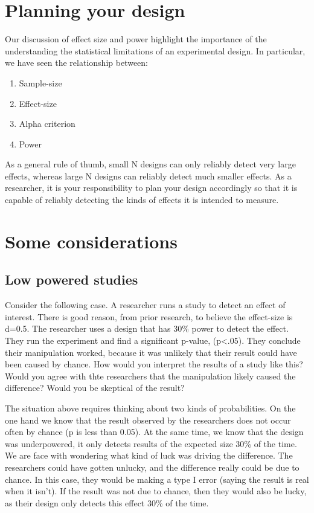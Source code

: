 \documentclass[
  letterpaper,
  DIV=11,
  numbers=noendperiod]{scrreprt}
\providecommand{\tightlist}{%
  \setlength{\itemsep}{0pt}\setlength{\parskip}{0pt}}\usepackage{longtable,booktabs,array}
\begin{document}
\section{Planning your design}\label{planning-your-design-1}

Our discussion of effect size and power highlight the importance of the
understanding the statistical limitations of an experimental design. In
particular, we have seen the relationship between:

\begin{enumerate}
\def\labelenumi{\arabic{enumi}.}
\tightlist
\item
  Sample-size
\item
  Effect-size
\item
  Alpha criterion
\item
  Power
\end{enumerate}

As a general rule of thumb, small N designs can only reliably detect
very large effects, whereas large N designs can reliably detect much
smaller effects. As a researcher, it is your responsibility to plan your
design accordingly so that it is capable of reliably detecting the kinds
of effects it is intended to measure.

\section{Some considerations}\label{some-considerations-1}

\subsection{Low powered studies}\label{low-powered-studies-1}

Consider the following case. A researcher runs a study to detect an
effect of interest. There is good reason, from prior research, to
believe the effect-size is d=0.5. The researcher uses a design that has
30\% power to detect the effect. They run the experiment and find a
significant p-value, (p\textless.05). They conclude their manipulation
worked, because it was unlikely that their result could have been caused
by chance. How would you interpret the results of a study like this?
Would you agree with thte researchers that the manipulation likely
caused the difference? Would you be skeptical of the result?

The situation above requires thinking about two kinds of probabilities.
On the one hand we know that the result observed by the researchers does
not occur often by chance (p is less than 0.05). At the same time, we
know that the design was underpowered, it only detects results of the
expected size 30\% of the time. We are face with wondering what kind of
luck was driving the difference. The researchers could have gotten
unlucky, and the difference really could be due to chance. In this case,
they would be making a type I error (saying the result is real when it
isn't). If the result was not due to chance, then they would also be
lucky, as their design only detects this effect 30\% of the time.
\end{document}
